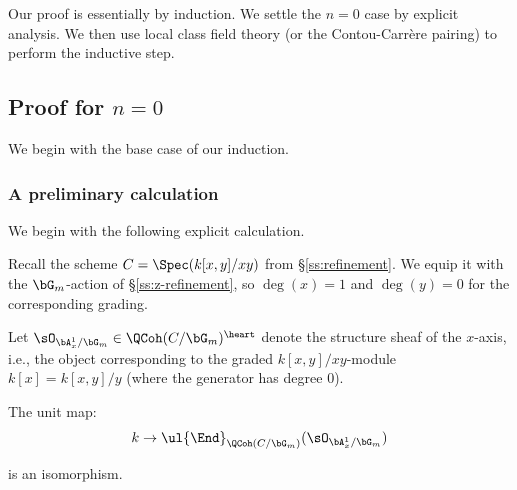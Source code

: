 Our proof is essentially by induction. We settle the $n = 0$ case
by explicit analysis. We then use local class field theory
(or the Contou-Carr\`ere pairing) to perform the inductive step.

\subsection{Proof for $n = 0$}

We begin with the base case of our induction.

\subsubsection{A preliminary calculation}

We begin with the following explicit calculation.

Recall the scheme $C = \Spec(k[x,y]/xy)$ from \S \ref{ss:refinement}.
We equip it with the $\bG_m$-action of \S \ref{ss:z-refinement},
so $\deg(x) = 1$ and $\deg(y) = 0$ for the corresponding grading.

Let $\sO_{\bA_x^1/\bG_m} \in \QCoh(C/\bG_m)^{\heart}$ denote the structure
sheaf of the $x$-axis, i.e., the object corresponding to the graded
$k[x,y]/xy$-module $k[x] = k[x,y]/y$ (where the generator has degree $0$).

\begin{lem}
\notready\label{l:c-ext}

The unit map:
%
\[
k \to \ul{\End}_{\QCoh(C/\bG_m)}(\sO_{\bA_x^1/\bG_m})
\]

 is an isomorphism.

\end{lem}

